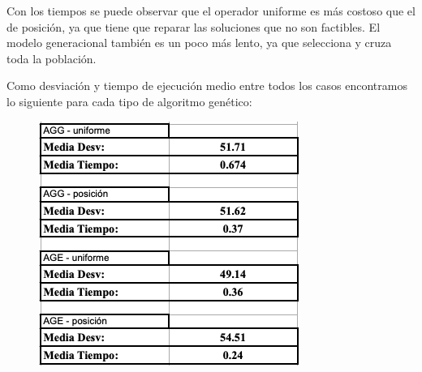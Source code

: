 Con los tiempos se puede observar que el operador uniforme es más costoso que el de posición, ya que tiene que reparar las soluciones que no son factibles. El modelo generacional también es un poco más lento, ya que selecciona y cruza toda la población.

Como desviación y tiempo de ejecución medio entre todos los casos encontramos lo siguiente para cada tipo de algoritmo genético:
\begin{figure}[H] %
    \centering
        \includegraphics[scale=0.8]{img/gen.png}
\end{figure}

